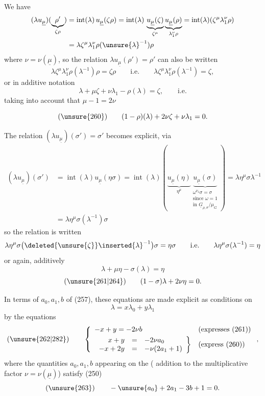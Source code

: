 We have\unsure{:}
\[
\begin{aligned}
(\lambda u_{\underline{\mu}})
(\underbrace{\rho'}_{\zeta\rho})
&=\operatorname{int}(\lambda)\,u_{\underline{\mu}}(\zeta\rho)
=\operatorname{int}(\lambda)\,
\underbrace{u_{\underline{\mu}}(\zeta)}_{\zeta^{\mu}}
\underbrace{u_{\underline{\mu}}(\rho)}_{\lambda_1^{\nu}\rho}
=\operatorname{int}(\lambda)(\zeta^{\mu}\lambda_1^{\nu}\rho)\\
&=\lambda\zeta^{\mu}\lambda_1^{\nu}\rho(\unsure{\lambda}^{-1})\rho
\end{aligned}
\]
where $\nu=\nu(\underline{\mu})$, so the relation
$\lambda u_{\underline{\mu}}(\rho')=\rho'$ can also be written
\[
\lambda\zeta^{\mu}\lambda_1^{\nu}\rho(\lambda^{-1})\rho
=\zeta\rho\qquad\text{i.e.}\qquad
\lambda\zeta^{\mu}\lambda_1^{\nu}\rho(\lambda^{-1})=\zeta,
\]
or in additive notation
\[
\lambda+\mu\zeta+\nu\lambda_1-\rho(\lambda)=\zeta,
\qquad\text{i.e.}
\]
taking into account that $\mu-1=2\nu$



\[
(\unsure{260})\qquad(1-\rho)(\lambda)+2\nu\zeta+\nu\lambda_1=0.
\]

The relation $(\lambda u_{\underline{\mu}})(\sigma')=\sigma'$ becomes explicit, via
\[
\begin{aligned}
(\lambda u_{\underline{\mu}})(\sigma')
&=\operatorname{int}(\lambda)u_{\underline{\mu}}(\eta\sigma)
=\operatorname{int}(\lambda)\left(
\underbrace{u_{\underline{\mu}}(\eta)}_{\eta^{\mu}}
\underbrace{u_{\underline{\mu}}(\sigma)}_{
\substack{\omega^{\nu_2}\sigma=\sigma\\
\text{since }\omega=1\\
\text{in }\underline{G}_{\rho,\sigma}/\mu_G}}
\right)=\lambda\eta^{\mu}\sigma\lambda^{-1}\\
&=\lambda\eta^{\mu}\sigma(\lambda^{-1})\sigma
\end{aligned}
\]
so the relation  is written
\[
\lambda\eta^{\mu}\sigma\bigl(\deleted{\unsure{\zeta}}\inserted{\lambda}^{-1}\bigr)\sigma
=\eta\sigma\qquad\text{i.e.}\qquad
\lambda\eta^{\mu}\sigma(\lambda^{-1})=\eta
\]
or again, additively
\[
\lambda+\mu\eta-\sigma(\lambda)=\eta
\]
\[
(\unsure{261|264})\qquad(1-\sigma)\lambda+2\nu\eta=0.
\]

In terms of $a_0,a_1,b$ of (257), these equations are made explicit as
conditions on
\[
\lambda=x\lambda_0+y\lambda_1
\]
by the equations
\[
(\unsure{262|282})\qquad
\left\{
\begin{array}{ll}
-x+y=-2\nu b&\text{(expresses (261))}\\[3pt]
\left.\begin{array}{rcl}
x+y&=&-2\nu a_0\\
-x+2y&=&-\nu(2a_1+1)
\end{array}\right\}&\text{(express (260))}
\end{array}\right.,
\]
where the quantities $a_0,a_1,b$ appearing on the 
( addition to the multiplicative factor
$\nu=\nu(\underline{\mu})$) satisfy (250)
\[
(\unsure{263})\qquad-\unsure{a_0}+2a_1-3b+1=0.
\]

